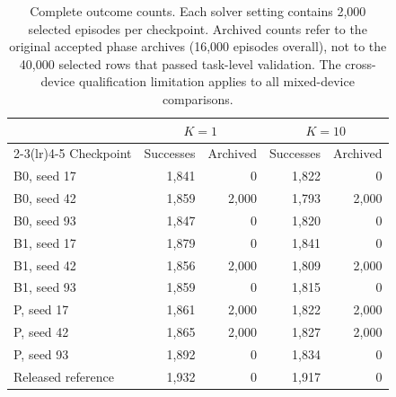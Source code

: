 \begin{table}[!htbp]\centering\small
\begin{tabular}{lrrrr}\toprule
& \multicolumn{2}{c}{$K=1$} & \multicolumn{2}{c}{$K=10$} \\
\cmidrule(lr){2-3}\cmidrule(lr){4-5}
Checkpoint & Successes & Archived & Successes & Archived \\ \midrule
B0, seed 17 & 1,841 & 0 & 1,822 & 0 \\
B0, seed 42 & 1,859 & 2,000 & 1,793 & 2,000 \\
B0, seed 93 & 1,847 & 0 & 1,820 & 0 \\
\addlinespace[3pt]
B1, seed 17 & 1,879 & 0 & 1,841 & 0 \\
B1, seed 42 & 1,856 & 2,000 & 1,809 & 2,000 \\
B1, seed 93 & 1,859 & 0 & 1,815 & 0 \\
\addlinespace[3pt]
P, seed 17 & 1,861 & 2,000 & 1,822 & 2,000 \\
P, seed 42 & 1,865 & 2,000 & 1,827 & 2,000 \\
P, seed 93 & 1,892 & 0 & 1,834 & 0 \\
\addlinespace[3pt]
Released reference & 1,932 & 0 & 1,917 & 0 \\
\bottomrule\end{tabular}\caption{Complete outcome counts. Each solver setting contains 2,000 selected episodes per checkpoint. Archived counts refer to the original accepted phase archives (16,000 episodes overall), not to the 40,000 selected rows that passed task-level validation. The cross-device qualification limitation applies to all mixed-device comparisons.}\label{tab:observed}\end{table}
